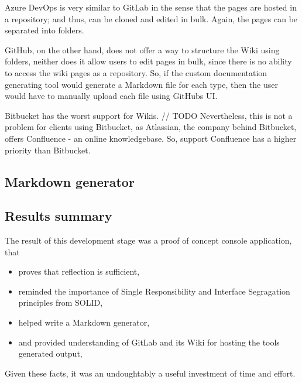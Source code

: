 Azure DevOps is very similar to GitLab in the sense that the pages are hosted in a repository; and thus, can be cloned and edited in bulk. Again, the pages can be separated into folders.

GitHub, on the other hand, does not offer a way to structure the Wiki using folders, neither does it allow users to edit pages in bulk, since there is no ability to access the wiki pages as a repository. So, if the custom documentation generating tool would generate a Markdown file for each type, then the user would have to manually upload each file using GitHubs UI.

Bitbucket has the worst support for Wikis.
// TODO
Nevertheless, this is not a problem for clients using Bitbucket, as Atlassian, the company behind Bitbucket, offers Confluence - an online knowledgebase. So, support Confluence has a higher priority than Bitbucket.

\subsection{Markdown generator}

\subsection{Results summary}

The result of this development stage was a proof of concept console application, that
\begin{itemize}
    \item proves that reflection is sufficient,
    \item reminded the importance of Single Responsibility and Interface Segragation principles from SOLID,
    \item helped write a Markdown generator,
    \item and provided understanding of GitLab and its Wiki for hosting the tools generated output,
\end{itemize}

Given these facts, it was an undoughtably a useful investment of time and effort.